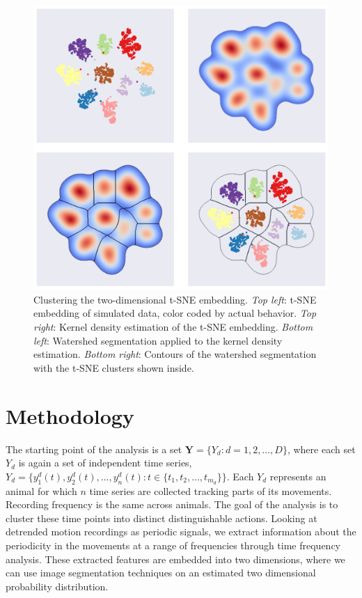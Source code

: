 \documentclass[a4paper, 10pt]{memoir}
\theoremstyle{plain}
\theoremstyle{definition}
\theoremstyle{remark}
\begin{document}
\begin{figure}[tb]
        \centering
        \includegraphics[width=0.8\linewidth]{./code/figures/clustering_example.pdf}
        \caption{Clustering the two-dimensional t-SNE embedding. \textit{Top left}: t-SNE embedding of simulated data, color coded by actual behavior. 
        \textit{Top right}: Kernel density estimation of the t-SNE embedding.
\textit{Bottom left}: Watershed segmentation applied to the kernel density estimation.
\textit{Bottom right}: Contours of the watershed segmentation with the t-SNE clusters shown inside.}
        \label{fig:clustering_example}
\end{figure}





\chapter{Methodology}
The starting point of the analysis is a set $\textbf{Y} =  \{ Y_d : d = 1, 2, \hdots, D \}$, where each set $Y_d$ is again a set of independent time series, $Y_d = \{ y_1^d(t), y_2^d(t), \hdots, y_n^d(t): t \in \{t_1, t_2, \hdots, t_{m_d} \} \}$.
Each $Y_d$ represents an animal for which $n$ time series are collected tracking parts of its movements.
Recording frequency is the same across animals.
The goal of the analysis is to cluster these time points into distinct distinguishable actions.
Looking at detrended motion recordings as periodic signals, we extract information about the periodicity in the movements at a range of frequencies through time frequency analysis.
These extracted features are embedded into two dimensions, where we can use image segmentation techniques on an estimated two dimensional probability distribution.
\end{document}
